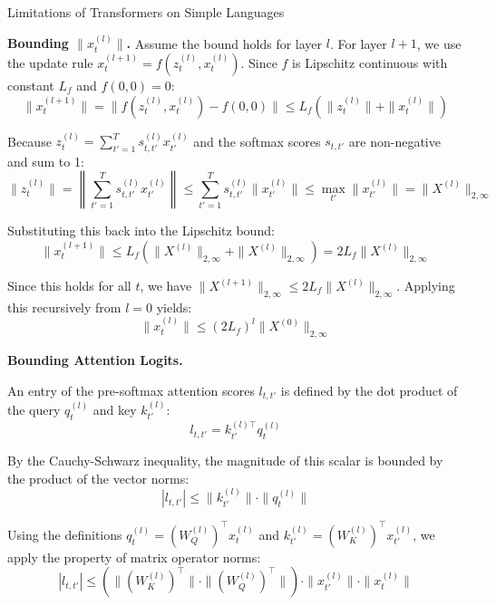 \begin{question}{Limitations of Transformers on Simple Languages}
\begin{subquestion}{\textbf{Bounding $\|x_{t}^{(l)}\|$.}}
    Assume the bound holds for layer $l$. For layer $l+1$, we use the update rule $x_t^{(l+1)} = f(z_t^{(l)}, x_t^{(l)})$. Since $f$ is Lipschitz continuous with constant $L_f$ and $f(0,0)=0$:
    \begin{equation}
    \|x_t^{(l+1)}\| = \|f(z_t^{(l)}, x_t^{(l)}) - f(0,0)\| \le L_f (\|z_t^{(l)}\| + \|x_t^{(l)}\|)
    \end{equation}

    Because $z_t^{(l)} = \sum_{t'=1}^{T} s_{t,t'}^{(l)} x_{t'}^{(l)}$ and the softmax scores $s_{t,t'}$ are non-negative and sum to 1:
    \begin{equation}
    \|z_t^{(l)}\| = \left\| \sum_{t'=1}^{T} s_{t,t'}^{(l)} x_{t'}^{(l)} \right\| \le \sum_{t'=1}^{T} s_{t,t'}^{(l)} \|x_{t'}^{(l)}\| \le \max_{t'} \|x_{t'}^{(l)}\| = \|X^{(l)}\|_{2,\infty}
    \end{equation}

    Substituting this back into the Lipschitz bound:
    \begin{equation}
    \|x_t^{(l+1)}\| \le L_f (\|X^{(l)}\|_{2,\infty} + \|X^{(l)}\|_{2,\infty}) = 2L_f \|X^{(l)}\|_{2,\infty}
    \end{equation}

    Since this holds for all $t$, we have $\|X^{(l+1)}\|_{2,\infty} \le 2L_f \|X^{(l)}\|_{2,\infty}$. Applying this recursively from $l=0$ yields:
    \begin{equation}
    \|x_t^{(l)}\| \le (2L_f)^l \|X^{(0)}\|_{2,\infty}
    \end{equation}

\end{subquestion}

\begin{subquestion}{\textbf{Bounding Attention Logits.}}

    An entry of the pre-softmax attention scores $l_{t, t'}$ is defined by the dot product of the query $q_t^{(l)}$ and key $k_{t'}^{(l)}$:
    \begin{equation}
    l_{t, t'} = k_{t'}^{(l)\top} q_t^{(l)}
    \end{equation}

    By the Cauchy-Schwarz inequality, the magnitude of this scalar is bounded by the product of the vector norms:
    \begin{equation}
    |l_{t, t'}| \le \|k_{t'}^{(l)}\| \cdot \|q_t^{(l)}\|
    \end{equation}

    Using the definitions $q_t^{(l)} = (W_Q^{(l)})^\top x_t^{(l)}$ and $k_{t'}^{(l)} = (W_K^{(l)})^\top x_{t'}^{(l)}$, we apply the property of matrix operator norms:
    \begin{equation}
    |l_{t, t'}| \le (\|(W_K^{(l)})^\top\| \cdot \|(W_Q^{(l)})^\top\|) \cdot \|x_{t'}^{(l)}\| \cdot \|x_t^{(l)}\|
    \end{equation}


\end{subquestion}
\end{question}
